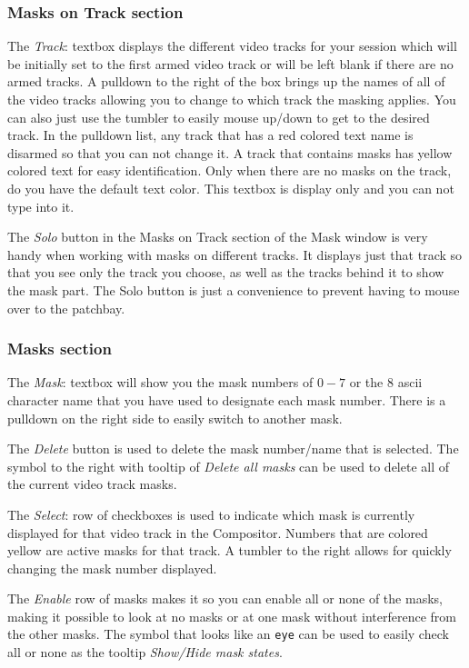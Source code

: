 \subsubsection*{Masks on Track section}%
\label{ssub:masks_track_section}

The \textit{Track}: textbox displays the different video tracks for your session which will be initially set to the first armed video track or will be left blank if there are no armed tracks.  A pulldown to the right of the box brings up the names of all of the video tracks allowing you to change to which track the masking applies.  You can also just use the tumbler to easily mouse up/down to get to the desired track. In the pulldown list, any track that has a red colored text name is disarmed so that you can not change it.  A track that contains masks has yellow colored text for easy identification.  Only when there are no masks on the track, do you have the default text color. This textbox is display only and you can not type into it.

The \textit{Solo} button in the Masks on Track section of the Mask window is very handy when working with masks on different tracks.  It displays just that track so that you see only the track you choose, as well as the tracks behind it to show the mask part.  The Solo button is just a convenience to prevent having to mouse over to the patchbay.

\subsubsection*{Masks section}%
\label{ssub:masks_section}

The \textit{Mask}: textbox will show you the mask numbers of $0-7$ or the 8 ascii character name that you have used to designate each mask number.  There is a pulldown on the right side to easily switch to another mask. 

The \textit{Delete} button is used to delete the mask number/name that is selected. The symbol to the right with tooltip of \textit{Delete all masks} can be used to delete all of the current video track masks.

The \textit{Select}: row of checkboxes is used to indicate which mask is currently displayed for that video track in the Compositor.  Numbers that are colored yellow are active masks for that track.  A tumbler to the right allows for quickly changing the mask number displayed.

The \textit{Enable} row of masks makes it so you can enable all or none of the masks, making it possible to look at no masks or at one mask without interference from the other masks. The symbol that looks like an \texttt{eye} can be used to easily check all or none as the tooltip \textit{Show/Hide mask states}.


